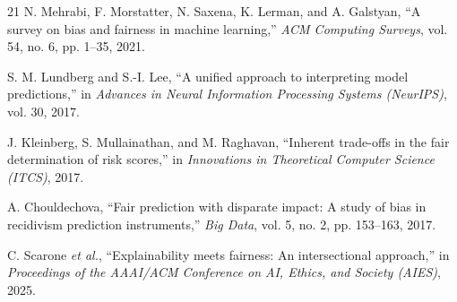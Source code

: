 \documentclass[conference]{IEEEtran}
\begin{document}
\begin{thebibliography}{21}
N. Mehrabi, F. Morstatter, N. Saxena, K. Lerman, and A. Galstyan, 
``A survey on bias and fairness in machine learning,'' 
\textit{ACM Computing Surveys}, vol. 54, no. 6, pp. 1--35, 2021.

S. M. Lundberg and S.-I. Lee, 
``A unified approach to interpreting model predictions,'' 
in \textit{Advances in Neural Information Processing Systems (NeurIPS)}, vol. 30, 2017.

J. Kleinberg, S. Mullainathan, and M. Raghavan, 
``Inherent trade-offs in the fair determination of risk scores,'' 
in \textit{Innovations in Theoretical Computer Science (ITCS)}, 2017.

A. Chouldechova, 
``Fair prediction with disparate impact: A study of bias in recidivism prediction instruments,'' 
\textit{Big Data}, vol. 5, no. 2, pp. 153--163, 2017.

C. Scarone \textit{et al.}, 
``Explainability meets fairness: An intersectional approach,''
in \textit{Proceedings of the AAAI/ACM Conference on AI, Ethics, and Society (AIES)}, 2025.

\end{thebibliography}
\end{document}
